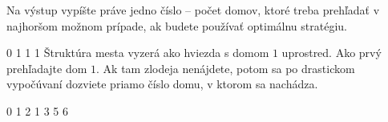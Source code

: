 
Na výstup vypíšte práve jedno číslo -- počet domov, ktoré treba prehľadať v
najhoršom možnom prípade, ak budete používať optimálnu stratégiu.


0 1 1 1
\sampleCOMMENT
Štruktúra mesta vyzerá ako hviezda s domom $1$ uprostred.
\sampleCOMMENT
Ako prvý prehľadajte dom $1$. Ak tam zlodeja nenájdete, potom sa po drastickom
vypočúvaní dozviete priamo číslo domu, v ktorom sa nachádza.
\sampleEND


\bigskip


0 1 2 1 3 5 6
\sampleEND



